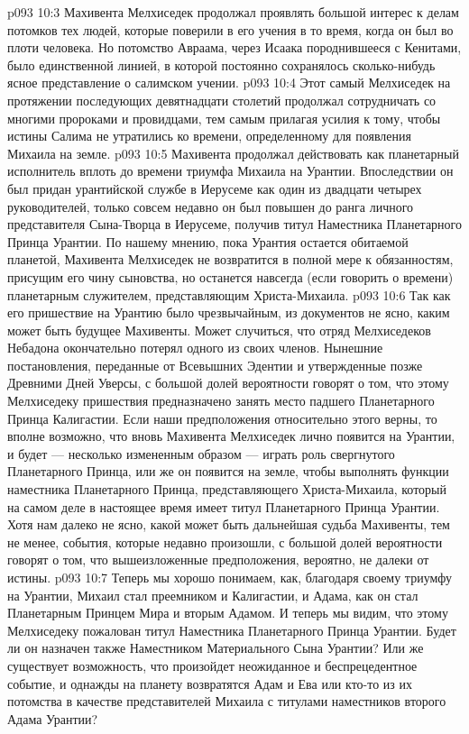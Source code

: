 \vs p093 10:3 \pc Махивента Мелхиседек продолжал проявлять большой интерес к делам потомков тех людей, которые поверили в его учения в то время, когда он был во плоти человека. Но потомство Авраама, через Исаака породнившееся с Кенитами, было единственной линией, в которой постоянно сохранялось сколько\hyp{}нибудь ясное представление о салимском учении.
\vs p093 10:4 Этот самый Мелхиседек на протяжении последующих девятнадцати столетий продолжал сотрудничать со многими пророками и провидцами, тем самым прилагая усилия к тому, чтобы истины Салима не утратились ко времени, определенному для появления Михаила на земле.
\vs p093 10:5 Махивента продолжал действовать как планетарный исполнитель вплоть до времени триумфа Михаила на Урантии. Впоследствии он был придан урантийской службе в Иерусеме как один из двадцати четырех руководителей, только совсем недавно он был повышен до ранга личного представителя Сына\hyp{}Творца в Иерусеме, получив титул Наместника Планетарного Принца Урантии. По нашему мнению, пока Урантия остается обитаемой планетой, Махивента Мелхиседек не возвратится в полной мере к обязанностям, присущим его чину сыновства, но останется навсегда (если говорить о времени) планетарным служителем, представляющим Христа\hyp{}Михаила.
\vs p093 10:6 Так как его пришествие на Урантию было чрезвычайным, из документов не ясно, каким может быть будущее Махивенты. Может случиться, что отряд Мелхиседеков Небадона окончательно потерял одного из своих членов. Нынешние постановления, переданные от Всевышних Эдентии и утвержденные позже Древними Дней Уверсы, с большой долей вероятности говорят о том, что этому Мелхиседеку пришествия предназначено занять место падшего Планетарного Принца Калигастии. Если наши предположения относительно этого верны, то вполне возможно, что вновь Махивента Мелхиседек лично появится на Урантии, и будет --- несколько измененным образом --- играть роль свергнутого Планетарного Принца, или же он появится на земле, чтобы выполнять функции наместника Планетарного Принца, представляющего Христа\hyp{}Михаила, который на самом деле в настоящее время имеет титул Планетарного Принца Урантии. Хотя нам далеко не ясно, какой может быть дальнейшая судьба Махивенты, тем не менее, события, которые недавно произошли, с большой долей вероятности говорят о том, что вышеизложенные предположения, вероятно, не далеки от истины.
\vs p093 10:7 Теперь мы хорошо понимаем, как, благодаря своему триумфу на Урантии, Михаил стал преемником и Калигастии, и Адама, как он стал Планетарным Принцем Мира и вторым Адамом. И теперь мы видим, что этому Мелхиседеку пожалован титул Наместника Планетарного Принца Урантии. Будет ли он назначен также Наместником Материального Сына Урантии? Или же существует возможность, что произойдет неожиданное и беспрецедентное событие, и однажды на планету возвратятся Адам и Ева или кто\hyp{}то из их потомства в качестве представителей Михаила с титулами наместников второго Адама Урантии?
